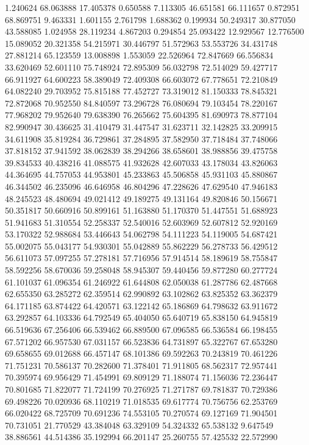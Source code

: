 1.240624
68.063888
17.405378
0.650588
7.113305
46.651581
66.111657
0.872951
68.869751
9.463331
1.601155
2.761798
1.688362
0.199934
50.249317
30.877050
43.588085
1.024958
28.119234
4.867203
0.294854
25.093422
12.929567
12.776500
15.089052
20.321358
54.215971
30.446797
51.572963
53.553726
34.431748
27.881214
65.123559
13.008898
1.553059
22.526964
72.847669
66.556834
33.620469
52.601110
75.748924
72.895309
56.032798
72.514029
59.427717
66.911927
64.600223
58.389049
72.409308
66.603072
67.778651
72.210849
64.082240
29.703952
75.815188
77.452727
73.319012
81.150333
78.845321
72.872068
70.952550
84.840597
73.296728
76.080694
79.103454
78.220167
77.968202
79.952640
79.638390
76.265662
75.604395
81.690973
78.877104
82.990947
30.436625
31.410479
31.447547
31.623711
32.142825
33.209915
34.611908
35.819284
36.729861
37.284895
37.582950
37.718484
37.748066
37.818152
37.941592
38.062839
38.294266
38.658601
38.988856
39.475758
39.834533
40.438216
41.088575
41.932628
42.607033
43.178034
43.826063
44.364695
44.757053
44.953801
45.233863
45.506858
45.931103
45.880867
46.344502
46.235096
46.646958
46.804296
47.228626
47.629540
47.946183
48.245523
48.480694
49.021412
49.189275
49.131164
49.820846
50.156671
50.351817
50.660916
50.899161
51.163880
51.170370
51.447551
51.688923
51.941683
51.310554
52.258337
52.540016
52.603969
52.607812
52.920169
53.170322
52.988684
53.446643
54.062798
54.111223
54.119005
54.687421
55.002075
55.043177
54.930301
55.042889
55.862229
56.278733
56.429512
56.611073
57.097255
57.278181
57.716956
57.914514
58.189619
58.755847
58.592256
58.670036
59.258048
58.945307
59.440456
59.877280
60.277724
61.101037
61.096354
61.246922
61.644808
62.050038
61.287786
62.487668
62.655350
63.285272
62.359514
62.990892
63.102862
63.825352
63.362379
64.171185
63.874422
64.420571
63.122142
65.186869
64.798632
63.911672
63.292857
64.103336
64.792549
65.404050
65.640719
65.838150
64.945819
66.519636
67.256406
66.539462
66.889500
67.096585
66.536584
66.198455
67.571202
66.957530
67.031157
66.523836
64.731897
65.322767
67.653280
69.658655
69.012688
66.457147
68.101386
69.592263
70.243819
70.461226
71.751231
70.586137
70.282600
71.378401
71.911805
68.562317
72.957441
70.395974
69.956429
71.454991
69.809129
71.188074
71.156036
72.236447
70.801685
71.822077
71.724199
70.276925
71.271787
69.781837
70.729386
69.498226
70.020936
68.110219
71.018535
69.617774
70.756756
62.253769
66.020422
68.725709
70.691236
74.553105
70.270574
69.127169
71.904501
70.731051
21.770529
43.384048
63.329109
54.324332
65.538132
9.647549
38.886561
44.514386
35.192994
66.201147
25.260755
57.425532
22.572990
